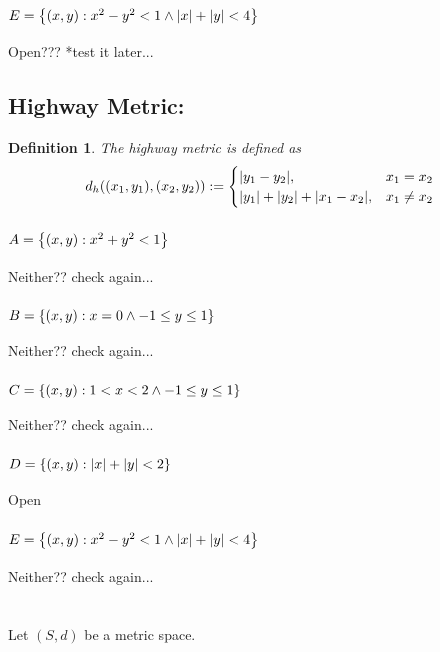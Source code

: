 \documentclass[]{article}
\newtheorem{definition}{Definition}
\begin{document}
\subsubsection{$E = \qty{(x,y) : x^2 - y^2 < 1 \land \abs{x} + \abs{y} < 4}$}
Open??? *test it later...


\subsection{Highway Metric:}
\begin{definition}
    The highway metric is defined as 
    \begin{displaymath}
        d_h((x_1,y_1),(x_2,y_2)) := 
        \begin{cases}
            \abs{y_1 - y_2}, &x_1 = x_2\\
            \abs{y_1} + \abs{y_2} + \abs{x_1 - x_2}, &x_1 \neq x_2
        \end{cases}
    \end{displaymath}
\end{definition}

\subsubsection{$A = \qty{(x,y) : x^2 + y^2 < 1}$}
Neither?? check again...
\subsubsection{$B = \qty{(x,y) : x = 0 \land -1 \leq y \leq 1}$}
Neither?? check again...
\subsubsection{$C = \qty{(x,y) : 1 < x < 2 \land -1 \leq y \leq 1}$}
Neither?? check again...
\subsubsection{$D = \qty{(x,y) : \abs{x} + \abs{y} < 2}$}
Open
\subsubsection{$E = \qty{(x,y) : x^2 - y^2 < 1 \land \abs{x} + \abs{y} < 4}$}
Neither?? check again...



\newpage
\section{}
Let $(S,d)$ be a metric space.
\end{document}
